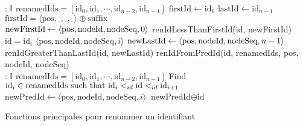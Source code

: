 \begin{algorithm}[!ht]
  \footnotesize
  \begin{algorithmic}[1]
       {: $\mathbb{I}$}
          \Statex \Comment $\text{renamedIds} = [\text{id}_0, \text{id}_1, \cdots, \text{id}_{n-2}, \text{id}_{n-1}]$
          \State $\text{firstId} \gets \text{id}_0$
          \State $\text{lastId} \gets \text{id}_{n - 1}$
          \Statex \Comment $\text{firstId} = \langle \text{pos}, \_, \_, \_ \rangle \oplus \text{suffix}$
          \\
              \State $\text{newFirstId} \gets \langle \text{pos},\text{nodeId},\text{nodeSeq},0 \rangle$
              \State \Return renIdLessThanFirstId(id, newFirstId)
              \Statex \Comment $\text{id} = \text{id}_i$
              \State \Return $\langle \text{pos}, \text{nodeId}, \text{nodeSeq}, i \rangle$ \label{alg:rename-id-in-renamedids}
              \State $\text{newLastId} \gets \langle \text{pos},\text{nodeId},\text{nodeSeq},n-1 \rangle$
              \State \Return renIdGreaterThanLastId(id, newLastId)
          \Else
              \State \Return renIdFromPredId(id, renamedIds, pos, nodeId, nodeSeq)
          \EndIf
      \EndFunction
      \\
       {: $\mathbb{I}$}
          \Statex \Comment $\text{renamedIds} = [\text{id}_0, \text{id}_1, \cdots, \text{id}_{n-2}, \text{id}_{n-1}]$
          \State Find $\text{id}_i \in \text{renamedIds such that id}_i <_{id} \text{id} <_{id} \text{id}_{i+1}$ \label{alg:renameId-find-predecessor}
          \State $\text{newPredId} \gets \langle \text{pos}, \text{nodeId}, \text{nodeSeq}, i \rangle$ \label{alg:renameId-rename-predecessor}
          \State \Return $\text{newPredId} \oplus \text{id}$ \label{alg:renameId-concat-predecessor}
      \EndFunction
  \end{algorithmic}
  \caption{Fonctions principales pour renommer un identifiant}
  \label{alg:renameId}
\end{algorithm}

